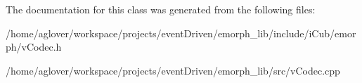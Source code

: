 The documentation for this class was generated from the following files\-:\begin{DoxyCompactItemize}
\item 
/home/aglover/workspace/projects/event\-Driven/emorph\-\_\-lib/include/i\-Cub/emorph/v\-Codec.\-h\item 
/home/aglover/workspace/projects/event\-Driven/emorph\-\_\-lib/src/v\-Codec.\-cpp\end{DoxyCompactItemize}
